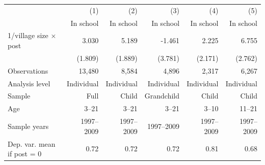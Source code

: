 \begin{center} \begin{threeparttable} \begin{tabular}{l*{5}{r}} \hline \hline 
                    &         (1)&         (2)&         (3)&         (4)&         (5)\\
                    &   In school&   In school&   In school&   In school&   In school\\
\hline
1/village size $\times$ post&       3.030&       5.189&      -1.461&       2.225&       6.755\\
                    &     (1.809)&     (1.889)&     (3.781)&     (2.171)&     (2.762)\\
\hline
Observations        &      13,480&       8,584&       4,896&       2,317&       6,267\\
Analysis level      &  Individual&  Individual&  Individual&  Individual&  Individual\\
Sample              &        Full&       Child&  Grandchild&       Child&       Child\\
Age                 &       3--21&       3--21&       3--21&       3--10&      11--21\\
Sample years        &  1997--2009&  1997--2009&  1997--2009&  1997--2009&  1997--2009\\
Dep. var. mean if post = 0&        0.72&        0.72&        0.72&        0.81&        0.68\\
\hline \end{tabular} \end{threeparttable} \end{center}
